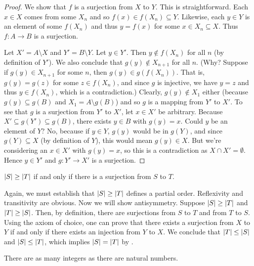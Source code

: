 \documentclass[11pt,twoside=off,numbers=noenddot]{scrbook}
\begin{document}
\begin{proof}
  We show that $f$ is a surjection from $X$ to $Y$. This is
  straightforward. Each $x \in X$ comes from some $X_n$ and so $f(x)
  \in f(X_n) \subseteq Y$. Likewise, each $y \in Y$ is an element of
  some $f(X_n)$ and thus $y = f(x)$ for some $x \in X_n \subseteq X$.
  Thus $f : A \to B$ is a surjection.

  Let $X' = A \setminus X$ and $Y' = B \setminus Y$. Let $y \in Y'$.
  Then $y \notin f(X_n)$ for all $n$ (by definition of $Y'$). We also
  conclude that $g(y) \notin X_{n + 1}$ for all $n$. (Why? Suppose if
    $g(y) \in X_{n + 1}$ for some $n$, then $g(y) \in g(f(X_n))$. That
    is, $g(y) = g(z)$ for some $z \in f(X_n)$, and since $g$ is
    injective, we have $y = z$ and thus $y \in f(X_n)$, which is a
  contradiction.) Clearly, $g(y) \notin X_1$ either (because $g(y)
  \subseteq g(B)$ and $X_1 = A \setminus g(B)$) and so $g$ is a
  mapping from $Y'$ to $X'$. To see that $g$ is a surjection from
  $Y'$ to $X'$, let $x \in X'$ be arbitrary. Because $X' \subseteq
  g(Y') \subseteq g(B)$, there exists $y \in B$ with $g(y) = x$.
  Could $y$ be an element of $Y$? No, because if $y \in Y$, $g(y)$
  would be in $g(Y)$, and since $g(Y) \subseteq X$ (by definition of
  $Y$), this would mean $g(y) \in X$. But we're considering an $x \in
  X'$ with $g(y) = x$, so this is a contradiction as $X \cap X' =
  \emptyset$. Hence $y \in Y'$ and $g : Y' \to X'$ is a surjection.
\end{proof}

\begin{definition}
  $| S | \geq | T |$ if and only if there is a surjection from $S$ to $T$.
\end{definition}

\begin{remark}
  Again, we must establish that $| S | \geq | T |$ defines a
  partial order. Reflexivity and transitivity are obvious. Now we
  will show antisymmetry. Suppose $| S | \geq | T |$ and
  $| T | \geq | S |$. Then, by definition, there are
  surjections from $S$ to $T$ and from $T$ to $S$. Using the axiom of
  choice, one can prove that there exists a surjection from $X$ to
  $Y$ if and only if there exists an injection from $Y$ to $X$. We
  conclude that $| T | \leq | S |$ and $| S | \leq
  | T |$, which implies $| S | = | T |$ by .
\end{remark}

\begin{theorem}[$\abs{\ZZ} = \abs{\NN}$]
  There are as many integers as there are natural numbers.
\end{theorem}
\end{document}
